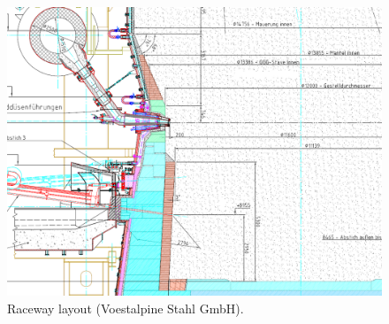 \begin{figure}[!htb]
\centering
\includegraphics[width=.80\columnwidth]{images/068racewaylayout}
\caption[Raceway layout]{Raceway layout (Voestalpine Stahl GmbH).}
\label{fig:068racewaylayout}
\end{figure}